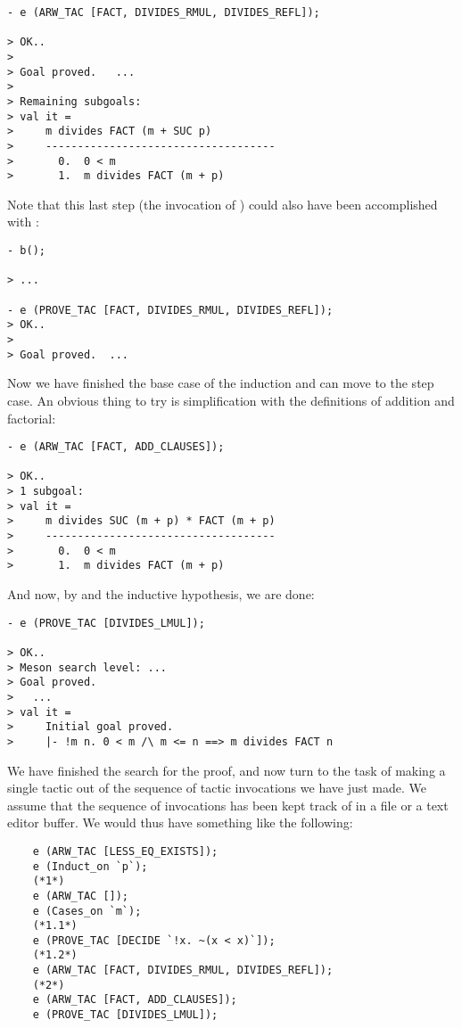 \begin{session}\begin{verbatim}
- e (ARW_TAC [FACT, DIVIDES_RMUL, DIVIDES_REFL]);

> OK..
>
> Goal proved.   ...
>
> Remaining subgoals:
> val it =
>     m divides FACT (m + SUC p)
>     ------------------------------------
>       0.  0 < m
>       1.  m divides FACT (m + p)
\end{verbatim}\end{session}
Note that this last step (the invocation of )
could also have been accomplished with :
\begin{session}\begin{verbatim}
- b();

> ...

- e (PROVE_TAC [FACT, DIVIDES_RMUL, DIVIDES_REFL]);
> OK..
>
> Goal proved.  ...
\end{verbatim}\end{session}
Now we have finished the base case of the induction and can move to the
step case. An obvious thing to try is simplification with the
definitions of addition and factorial:
\begin{session}\begin{verbatim}
- e (ARW_TAC [FACT, ADD_CLAUSES]);

> OK..
> 1 subgoal:
> val it =
>     m divides SUC (m + p) * FACT (m + p)
>     ------------------------------------
>       0.  0 < m
>       1.  m divides FACT (m + p)
\end{verbatim}\end{session}
\noindent And now, by  and the inductive hypothesis, we are
done:
\begin{session}\begin{verbatim}
- e (PROVE_TAC [DIVIDES_LMUL]);

> OK..
> Meson search level: ...
> Goal proved.
>   ...
> val it =
>     Initial goal proved.
>     |- !m n. 0 < m /\ m <= n ==> m divides FACT n
\end{verbatim}\end{session}
We have finished the search for the proof, and now turn to the task of
making a single tactic out of the sequence of tactic invocations we have
just made. We assume that the sequence of invocations has been kept
track of in a file or a text editor buffer. We would thus have something
like the following:
{\small \begin{verbatim}
    e (ARW_TAC [LESS_EQ_EXISTS]);
    e (Induct_on `p`);
    (*1*)
    e (ARW_TAC []);
    e (Cases_on `m`);
    (*1.1*)
    e (PROVE_TAC [DECIDE `!x. ~(x < x)`]);
    (*1.2*)
    e (ARW_TAC [FACT, DIVIDES_RMUL, DIVIDES_REFL]);
    (*2*)
    e (ARW_TAC [FACT, ADD_CLAUSES]);
    e (PROVE_TAC [DIVIDES_LMUL]);
\end{verbatim}}
\noindent

